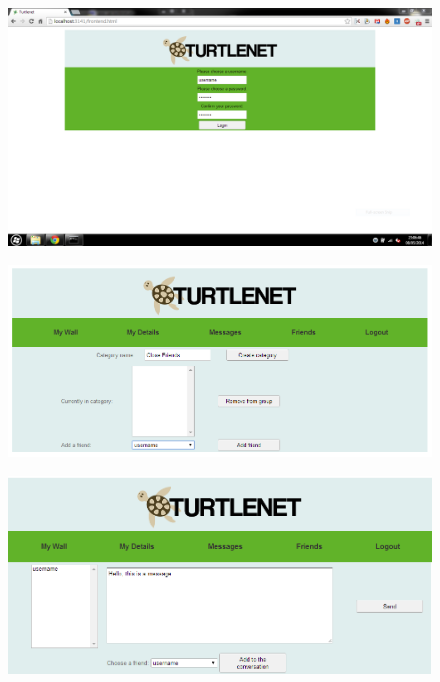 \begin{figure}[h]
    \centering
    \includegraphics{images/screenshots/5loginagain.png}
\end{figure}

\begin{figure}[h]
    \centering
    \includegraphics{images/screenshots/crop1.png}
\end{figure}

\begin{figure}[h]
    \centering
    \includegraphics{images/screenshots/crop2.png}
\end{figure}


